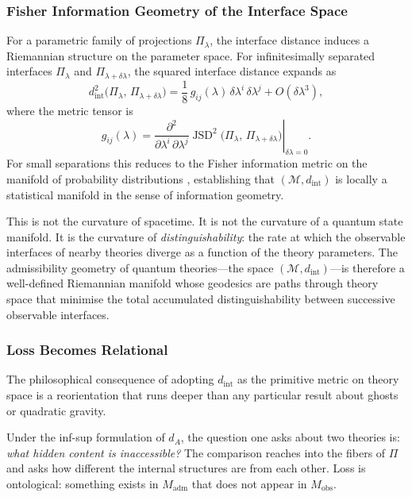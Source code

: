 \documentclass[12pt,a4paper]{article}
\theoremstyle{remark}
\begin{document}
\subsubsection*{Fisher Information Geometry of the Interface Space}

For a parametric family of projections $\Pi_\lambda$, the interface
distance induces a Riemannian structure on the parameter space. For
infinitesimally separated interfaces $\Pi_\lambda$ and $\Pi_{\lambda +
\delta\lambda}$, the squared interface distance expands as
\begin{equation}
  d_{\mathrm{int}}^2\!\bigl(\Pi_\lambda,\, \Pi_{\lambda+\delta\lambda}\bigr)
  = \frac{1}{8}\,g_{ij}(\lambda)\,\delta\lambda^i\,\delta\lambda^j
    + O(\delta\lambda^3),
\end{equation}
where the metric tensor is
\begin{equation}
  g_{ij}(\lambda)
  = \left.
      \frac{\partial^2}{\partial\lambda^i\,\partial\lambda^j}
      \operatorname{JSD}^2\!\bigl(\Pi_\lambda,\, \Pi_{\lambda+\delta\lambda}\bigr)
    \right|_{\delta\lambda=0}.
  \label{eq:fisher_metric}
\end{equation}
For small separations this reduces to the Fisher information metric on the
manifold of probability distributions \cite{amari2000}, establishing that
$(\mathcal{M}, d_{\mathrm{int}})$ is locally a statistical manifold in the
sense of information geometry.

This is not the curvature of spacetime. It is not the curvature of a
quantum state manifold. It is the curvature of \emph{distinguishability}:
the rate at which the observable interfaces of nearby theories diverge as a
function of the theory parameters. The admissibility geometry of quantum
theories---the space $(\mathcal{M}, d_{\mathrm{int}})$---is therefore a
well-defined Riemannian manifold whose geodesics are paths through theory
space that minimise the total accumulated distinguishability between
successive observable interfaces.

\subsubsection*{Loss Becomes Relational}

The philosophical consequence of adopting $d_{\mathrm{int}}$ as the
primitive metric on theory space is a reorientation that runs deeper than
any particular result about ghosts or quadratic gravity.

Under the inf-sup formulation of $d_A$, the question one asks about two
theories is: \emph{what hidden content is inaccessible?} The comparison
reaches into the fibers of $\Pi$ and asks how different the internal
structures are from each other. Loss is ontological: something exists in
$M_{\mathrm{adm}}$ that does not appear in $M_{\mathrm{obs}}$.
\end{document}
